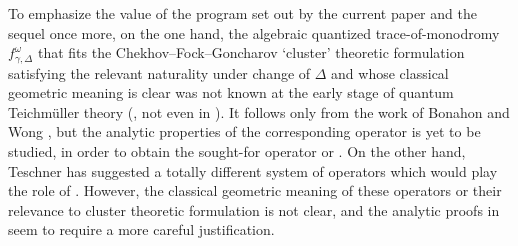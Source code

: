 \documentclass[10pt,a4paper]{amsart}
\numberwithin{equation}{section}
\theoremstyle{definition}
\begin{document}
To emphasize the value of the program set out by the current paper and the sequel \cite{sequel} once more, on the one hand, the algebraic quantized trace-of-monodromy $f^\omega_{\gamma,\Delta}$ that fits the Chekhov--Fock--Goncharov `cluster' theoretic formulation satisfying the relevant naturality under change of $\Delta$ and whose classical geometric meaning is clear was not known at the early stage of quantum Teichm\"uller theory (\cite{F97, CF}, not even in \cite{FG09}). It follows only from the work of Bonahon and Wong \cite{BW}, but the analytic properties of the corresponding operator  is yet to be studied, in order to obtain the sought-for operator  or . On the other hand, Teschner \cite{T} has suggested a totally different system of operators which would play the role of . However, the classical geometric meaning of these operators or their relevance to cluster theoretic formulation is not clear, and the analytic proofs in \cite{T} seem to require a more careful justification.
\end{document}
